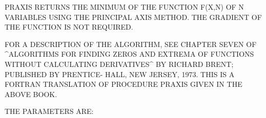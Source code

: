 P\-R\-A\-X\-I\-S R\-E\-T\-U\-R\-N\-S T\-H\-E M\-I\-N\-I\-M\-U\-M O\-F T\-H\-E F\-U\-N\-C\-T\-I\-O\-N F(\-X,\-N) O\-F N V\-A\-R\-I\-A\-B\-L\-E\-S U\-S\-I\-N\-G T\-H\-E P\-R\-I\-N\-C\-I\-P\-A\-L A\-X\-I\-S M\-E\-T\-H\-O\-D. T\-H\-E G\-R\-A\-D\-I\-E\-N\-T O\-F T\-H\-E F\-U\-N\-C\-T\-I\-O\-N I\-S N\-O\-T R\-E\-Q\-U\-I\-R\-E\-D. 

\begin{DoxyVerb} FOR A DESCRIPTION OF THE ALGORITHM, SEE CHAPTER SEVEN OF
 ^ALGORITHMS FOR FINDING ZEROS AND EXTREMA OF FUNCTIONS WITHOUT
 CALCULATING DERIVATIVES^ BY RICHARD BRENT; PUBLISHED BY PRENTICE-
 HALL, NEW JERSEY, 1973.  THIS IS A FORTRAN TRANSLATION OF
 PROCEDURE PRAXIS GIVEN IN THE ABOVE BOOK.

 THE PARAMETERS ARE:
\end{DoxyVerb}
 
